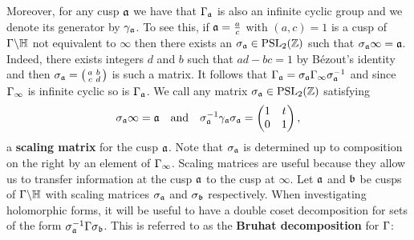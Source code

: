     Moreover, for any cusp $\mathfrak{a}$ we have that $\Gamma_{\mathfrak{a}}$ is also an infinite cyclic group and we denote its generator by $\gamma_{\mathfrak{a}}$. To see this, if $\mathfrak{a} = \frac{a}{c}$ with $(a,c) = 1$ is a cusp of $\Gamma\backslash\mathbb{H}$ not equivalent to $\infty$ then there exists an $\sigma_{\mathfrak{a}} \in \mathrm{PSL}_{2}(\mathbb{Z})$ such that $\sigma_{\mathfrak{a}}\infty = \mathfrak{a}$. Indeed, there exists integers $d$ and $b$ such that $ad-bc = 1$ by B\'ezout's identity and then $\sigma_{\mathfrak{a}} = \begin{psmallmatrix} a & b \\ c & d \end{psmallmatrix}$ is such a matrix. It follows that $\Gamma_{\mathfrak{a}} = \sigma_{\mathfrak{a}}\Gamma_{\infty}\sigma_{\mathfrak{a}}^{-1}$ and since $\Gamma_{\infty}$ is infinite cyclic so is $\Gamma_{\mathfrak{a}}$. We call any matrix $\sigma_{\mathfrak{a}} \in \mathrm{PSL}_{2}(\mathbb{Z})$ satisfying 
    \[
      \sigma_{\mathfrak{a}}\infty = \mathfrak{a} \quad \text{and} \quad \sigma_{\mathfrak{a}}^{-1}\gamma_{\mathfrak{a}}\sigma_{\mathfrak{a}} = \begin{pmatrix} 1 & t \\ 0 & 1 \end{pmatrix},
    \]
    a \textbf{scaling matrix} for the cusp $\mathfrak{a}$. Note that $\sigma_{\mathfrak{a}}$ is determined up to composition on the right by an element of $\Gamma_{\infty}$. Scaling matrices are useful because they allow us to transfer information at the cusp $\mathfrak{a}$ to the cusp at $\infty$. Let $\mathfrak{a}$ and $\mathfrak{b}$ be cusps of $\Gamma\backslash\mathbb{H}$ with scaling matrices $\sigma_{\mathfrak{a}}$ and $\sigma_{\mathfrak{b}}$ respectively. When investigating holomorphic forms, it will be useful to have a double coset decomposition for sets of the form $\sigma_{\mathfrak{a}}^{-1}\Gamma\sigma_{\mathfrak{b}}$. This is referred to as the \textbf{Bruhat decomposition} for $\Gamma$:

